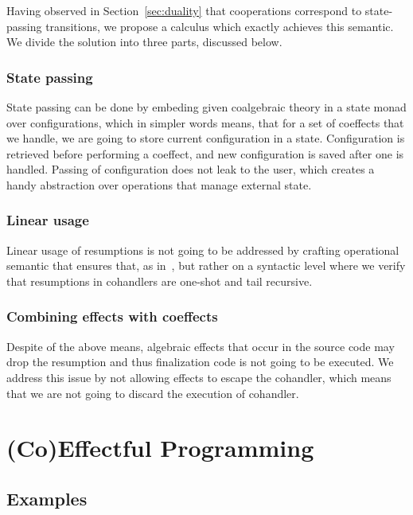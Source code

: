 \documentclass[declaration,shortabstract]{iithesis}
\theoremstyle{definition} \newtheorem{definition}{Definition}[chapter]
\theoremstyle{remark} \newtheorem{remark}[definition]{Observation}
\theoremstyle{plain} \newtheorem{theorem}[definition]{Theorem}
\theoremstyle{plain} \newtheorem{lemma}[definition]{Lemma}
\begin{document}

Having observed in Section~\ref{sec:duality} that cooperations correspond to
state-passing transitions, we propose a calculus which exactly achieves this
semantic. We divide the solution into three parts, discussed below.

\subsection{State passing}

State passing can be done by embeding given coalgebraic theory in a state monad
over configurations, which in simpler words means, that for a set of coeffects
that we handle, we are going to store current configuration in a state.
Configuration is retrieved before performing a coeffect, and new configuration
is saved after one is handled. Passing of configuration does not leak to the
user, which creates a handy abstraction over operations that manage external
state.

\subsection{Linear usage}

Linear usage of resumptions is not going to be addressed by crafting operational
semantic that ensures that, as in~\cite{runners-in-action}, but rather on a
syntactic level where we verify that resumptions in cohandlers are one-shot and
tail recursive.

\subsection{Combining effects with coeffects}

Despite of the above means, algebraic effects that occur in the source code may
drop the resumption and thus finalization code is not going to be executed.
We address this issue by not allowing effects to escape the cohandler, which
means that we are not going to discard the execution of cohandler.


\chapter{(Co)Effectful Programming}\label{chapter:co-effectful-programming}
\section{Examples}\label{sec:examples}
\end{document}

